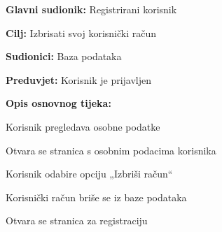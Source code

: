 \noindent {}
\begin{packed_item}
	
	\item \textbf{Glavni sudionik: }Registrirani korisnik
	\item  \textbf{Cilj:} Izbrisati svoj korisnički račun
	\item  \textbf{Sudionici:} Baza podataka
	\item  \textbf{Preduvjet:} Korisnik je prijavljen
	\item  \textbf{Opis osnovnog tijeka:}
	
	\item[] \begin{packed_enum}
		
		\item Korisnik pregledava osobne podatke
		\item Otvara se stranica s osobnim podacima korisnika
		\item Korisnik odabire opciju „Izbriši račun“
		\item Korisnički račun briše se iz baze podataka
		\item Otvara se stranica za registraciju
	\end{packed_enum}
	
\end{packed_item}

